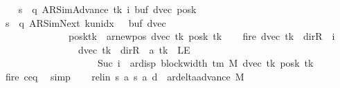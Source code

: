\begin{isabellebody}
\ \ \isamarkupfalse%
\ {\isacharquery}{\kern0pt}s\ {\isacharequal}{\kern0pt}\ {\isachardoublequoteopen}{\isacharparenleft}{\kern0pt}q{\isacharcomma}{\kern0pt}\ AR{\isacharunderscore}{\kern0pt}SimAdvance{\isacharcomma}{\kern0pt}\ tk{\isacharcomma}{\kern0pt}\ i{\isacharcomma}{\kern0pt}\ buf{\isacharcomma}{\kern0pt}\ dvec{\isacharcomma}{\kern0pt}\ posk{\isacharparenright}{\kern0pt}{\isachardoublequoteclose}\isanewline
\ \ \isamarkupfalse%
\ {\isacharquery}{\kern0pt}s{\isacharprime}{\kern0pt}\ {\isacharequal}{\kern0pt}\ {\isachardoublequoteopen}{\isacharparenleft}{\kern0pt}q{\isacharcomma}{\kern0pt}\ AR{\isacharunderscore}{\kern0pt}SimNext{\isacharcomma}{\kern0pt}\ k{\isacharunderscore}{\kern0pt}unidx\ {}{\isacharcomma}{\kern0pt}\ {}{\isacharcomma}{\kern0pt}\ buf{\isacharcomma}{\kern0pt}\ dvec{\isacharcomma}{\kern0pt}\isanewline
\ \ \ \ \ \ \ \ \ \ \ \ \ \ posk{\isacharparenleft}{\kern0pt}tk\ {\isacharcolon}{\kern0pt}{\isacharequal}{\kern0pt}\ ar{\isacharunderscore}{\kern0pt}newpos\ {\isacharparenleft}{\kern0pt}dvec\ tk{\isacharparenright}{\kern0pt}\ {\isacharparenleft}{\kern0pt}posk\ tk{\isacharparenright}{\kern0pt}{\isacharparenright}{\kern0pt}{\isacharparenright}{\kern0pt}{\isachardoublequoteclose}\isanewline
\ \ \isamarkupfalse%
\ fire{\isacharprime}{\kern0pt}{\isacharcolon}{\kern0pt}\ {\isachardoublequoteopen}{\isacharparenleft}{\kern0pt}dvec\ tk\ {\isacharequal}{\kern0pt}\ dir{\isachardot}{\kern0pt}R\ {\isasymand}\ i\ {\isacharequal}{\kern0pt}\ {}{\isacharparenright}{\kern0pt}\isanewline
\ \ \ \ \ \ \ \ \ \ \ \ \ \ \ {\isasymor}\ {\isacharparenleft}{\kern0pt}dvec\ tk\ {\isasymnoteq}\ dir{\isachardot}{\kern0pt}R\ {\isasymand}\ {\isacharquery}{\kern0pt}a\ tk\ {\isasymnoteq}\ LE{}\isanewline
\ \ \ \ \ \ \ \ \ \ \ \ \ \ \ \ \ \ \ {\isasymand}\ Suc\ i\ {\isacharequal}{\kern0pt}\ ar{\isacharunderscore}{\kern0pt}disp\ {\isacharparenleft}{\kern0pt}block{\isacharunderscore}{\kern0pt}width\ {\isacharparenleft}{\kern0pt}{\isasymGamma}{\isacharunderscore}{\kern0pt}tm\ M{\isacharparenright}{\kern0pt}{\isacharparenright}{\kern0pt}\ {\isacharparenleft}{\kern0pt}dvec\ tk{\isacharparenright}{\kern0pt}\ {\isacharparenleft}{\kern0pt}posk\ tk{\isacharparenright}{\kern0pt}{\isacharparenright}{\kern0pt}{\isachardoublequoteclose}\isanewline
\ \ \ \ \isamarkupfalse%
\ fire\ c{\isacharprime}{\kern0pt}{\isacharunderscore}{\kern0pt}eq\ \isamarkupfalse%
\ simp\isanewline
\ \ \isamarkupfalse%
\ rel{\isacharunderscore}{\kern0pt}in{\isacharcolon}{\kern0pt}\ {\isachardoublequoteopen}{\isacharparenleft}{\kern0pt}{\isacharquery}{\kern0pt}s{\isacharcomma}{\kern0pt}\ {\isacharquery}{\kern0pt}a{\isacharcomma}{\kern0pt}\ {\isacharquery}{\kern0pt}s{\isacharprime}{\kern0pt}{\isacharcomma}{\kern0pt}\ {\isacharquery}{\kern0pt}a{\isacharcomma}{\kern0pt}\ {\isacharquery}{\kern0pt}d{\isacharparenright}{\kern0pt}\ {\isasymin}\ ar{\isacharunderscore}{\kern0pt}delta{\isacharunderscore}{\kern0pt}advance\ M{\isachardoublequoteclose}\isanewline

\end{isabellebody}

